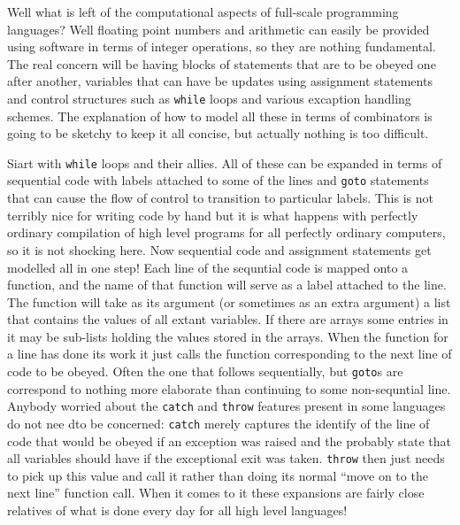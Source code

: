 Well what is left of the computational aspects of full-scale programming
languages? Well floating point numbers and arithmetic can easily be
provided using software in terms of integer operations, so they are nothing
fundamental. The real concern will be having blocks of statements that are
to be obeyed one after another, variables that can have be updates using
assignment statements and control structures such as \verb+while+ loops
and various excaption handling schemes. The explanation of how to model all
these in terms of combinators is going to be sketchy to keep it all concise,
but actually nothing is too difficult.

Siart with \verb+while+ loops and their allies. All of these can be
expanded in terms of sequential code with labels attached to some of the lines
and \verb+goto+ statements that can cause the flow of control to transition
to particular labels. This is not terribly nice for writing code by hand but
it is what happens with perfectly ordinary compilation of high level programs
for all perfectly ordinary computers, so it is not shocking here.
Now sequential code and assignment statements get modelled all in one
step! Each line of the sequntial code is mapped onto a function, and the
name of that function will serve as a label attached to the line. The
function will take as its argument (or sometimes as an extra argument) a
list that contains the values of all extant variables. If there are
arrays some entries in it may be sub-lists holding the values stored in the
arrays. When the function for a line has done its work it just calls
the function corresponding to the next line of code to be obeyed. Often the
one that follows sequentially, but \verb+goto+s are correspond to nothing
more elaborate than continuing to some non-sequntial line. Anybody
worried about the \verb+catch+ and \verb+throw+ features present in some
languages do not nee dto be concerned: \verb+catch+ merely captures the
identify of the line of code that would be obeyed if an exception was
raised and the probably state that all variables should have if the
exceptional exit was taken. \verb+throw+ then just needs to pick up this value
and call it rather than doing its normal ``move on to the next line''
function call. When it comes to it these expansions are fairly close relatives
of what is done every day for all high level languages!


